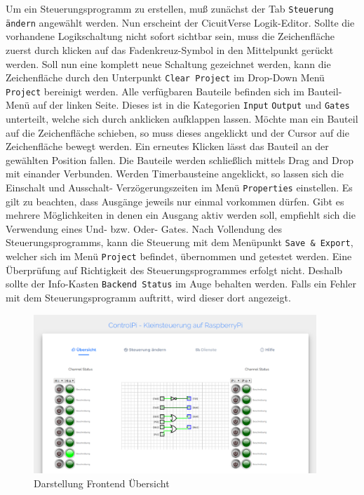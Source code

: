 Um ein Steuerungsprogramm zu erstellen, muß zunächst der Tab \texttt{Steuerung ändern} angewählt werden. Nun erscheint der CicuitVerse \cite{URL:CircuitVerse} Logik-Editor. Sollte die vorhandene Logikschaltung nicht sofort sichtbar sein, muss die Zeichenfläche zuerst durch klicken auf das Fadenkreuz-Symbol in den Mittelpunkt gerückt werden. Soll nun eine komplett neue Schaltung gezeichnet werden, kann die Zeichenfläche durch den Unterpunkt \texttt{Clear Project} im Drop-Down Menü \texttt{Project} bereinigt werden. Alle verfügbaren Bauteile befinden sich im Bauteil-Menü auf der linken Seite. Dieses ist in die Kategorien \texttt{Input} \texttt{Output} und \texttt{Gates} unterteilt, welche sich durch anklicken aufklappen lassen. Möchte man ein Bauteil auf die Zeichenfläche schieben, so muss dieses angeklickt und der Cursor auf die  Zeichenfläche bewegt werden. Ein erneutes Klicken lässt das Bauteil  an der gewählten Position fallen. Die Bauteile werden schließlich mittels Drag and Drop mit einander Verbunden. Werden Timerbausteine angeklickt, so  lassen  sich die Einschalt und Ausschalt- Verzögerungszeiten im Menü \texttt{Properties} einstellen. Es gilt zu beachten, dass Ausgänge jeweils nur einmal vorkommen dürfen. Gibt es mehrere Möglichkeiten in denen ein Ausgang aktiv werden soll, empfiehlt sich die Verwendung eines Und- bzw. Oder- Gates.  Nach Vollendung des Steuerungsprogramms, kann die Steuerung mit dem Menüpunkt \texttt{Save \& Export}, welcher sich im Menü \texttt{Project} befindet, übernommen und getestet werden. Eine Überprüfung auf Richtigkeit des Steuerungsprogrammes erfolgt nicht. Deshalb sollte der Info-Kasten \texttt{Backend Status} im Auge behalten werden. Falls ein Fehler mit dem Steuerungsprogramm auftritt, wird dieser dort angezeigt. 
 \begin{figure}[H]
	\begin{center}
		\includegraphics[width=0.95\textwidth]{./images/FrontendUebersicht.png}
		\caption{Darstellung Frontend Übersicht}
		\label{img:FrontendUebersicht}
	\end{center} 
\end{figure}	

